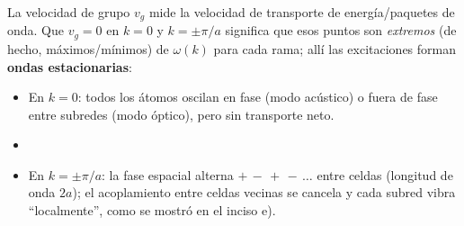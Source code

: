 \documentclass{article}
\begin{document}
\vspace{0.4cm}
La velocidad de grupo \(v_g\) mide la velocidad de transporte de energía/paquetes de onda.
Que \(v_g=0\) en \(k=0\) y \(k=\pm\pi/a\) significa que esos puntos son \emph{extremos}
(de hecho, máximos/mínimos) de \(\omega(k)\) para cada rama; allí las excitaciones forman
\textbf{ondas estacionarias}:
\begin{itemize}
  \item[$\bullet$] En \(k=0\): todos los átomos oscilan en fase (modo acústico) o fuera de fase entre subredes (modo óptico),
        pero sin transporte neto.
  \item\item[$\bullet$] En \(k=\pm\pi/a\): la fase espacial alterna \(+\,-\,+\,-\,\dots\) entre celdas (longitud de onda \(2a\));
        el acoplamiento entre celdas vecinas se cancela y cada subred vibra “localmente”, como se mostró en el inciso e).
\end{itemize}
\vspace{0.5cm}
\end{document}

